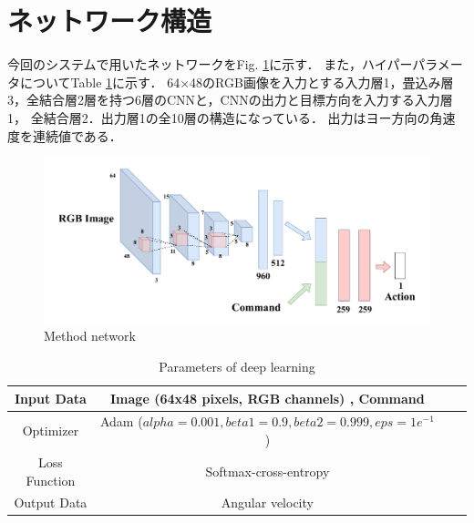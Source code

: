 \newpage
\section{ネットワーク構造}
\label{net}
今回のシステムで用いたネットワークをFig. \ref{fig::methodnetwork}に示す．
また，ハイパーパラメータについてTable \ref{tb::param}に示す．
64×48のRGB画像を入力とする入力層1，畳込み層3，全結合層2層を持つ6層のCNNと，CNNの出力と目標方向を入力する入力層1，
全結合層2．出力層1の全10層の構造になっている．
出力はヨー方向の角速度を連続値である．

\begin{figure}[h]
    \centering
    \includegraphics[width = 13cm]{./figs/network.pdf}
    \caption{Method network}
    \label{fig::methodnetwork}
\end{figure}
\begin{table}[h]
    \centering
    \caption{Parameters of deep learning}
    \begin{tabular}{|c|c|c|c|}
    \hline
    Input Data    & Image (64x48 pixels, RGB channels) , Command                                              \\ \hline
    Optimizer     & Adam ($alpha = 0.001, beta1 = 0.9, beta2 = 0.999, eps = 1e^{-1}$ )  \\ \hline
    Loss Function & Softmax-cross-entropy                                                            \\ \hline
    Output Data   & Angular velocity                                              \\ \hline
    \end{tabular}
    \label{tb::param}
    \end{table}
\newpage




